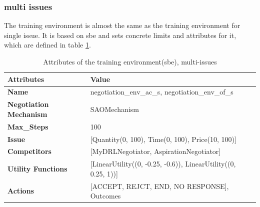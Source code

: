 \subsubsection{multi issues}
The training environment is almost the same as the training environment for single issue. It is based on \gls{sbe} and sets concrete limits and attributes for it, which are defined in table \ref{tab:attributes-sbe-multi-issues}.

\begin{table}[htbp]
\centering
\begin{tabular}{l l l} \toprule
\bfseries \textbf{Attributes}      & \bfseries \textbf{Value}             \\ \midrule
\textbf{Name}                    & negotiation\_env\_ac\_s, negotiation\_env\_of\_s                     \\
\textbf{Negotiation Mechanism}   & SAOMechanism                                                         \\
\textbf{Max\_Steps}              & 100                                                                  \\
\textbf{Issue}             	     & [Quantity(0, 100), Time(0, 100), Price(10, 100)]                     \\
\textbf{Competitors}             & [MyDRLNegotiator, AspirationNegotiator]                              \\
\textbf{Utility Functions}       & [LinearUtility((0, -0.25, -0.6)), LinearUtility((0, 0.25, 1))]       \\
\textbf{Actions}                 & [ACCEPT, REJCT, END, NO RESPONSE], Outcomes                                 \\
\bottomrule
\end{tabular}
\caption{Attributes of the training environment(sbe), multi-issues}
\label{tab:attributes-sbe-multi-issues}
\end{table}

